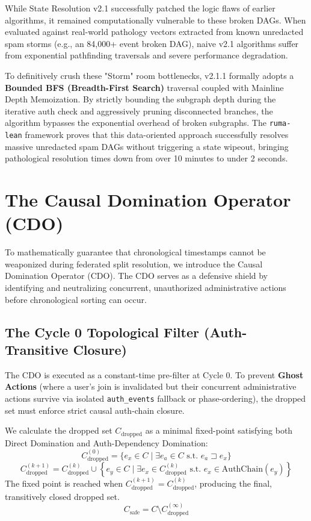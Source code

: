 \documentclass[12pt]{article}
\begin{document}
While State Resolution v2.1 successfully patched the logic flaws of earlier algorithms, it remained computationally vulnerable to these broken DAGs. When evaluated against real-world pathology vectors extracted from known unredacted spam storms (e.g., an 84,000+ event broken DAG), naive v2.1 algorithms suffer from exponential pathfinding traversals and severe performance degradation.

To definitively crush these "Storm" room bottlenecks, v2.1.1 formally adopts a \textbf{Bounded BFS (Breadth-First Search)} traversal coupled with Mainline Depth Memoization. By strictly bounding the subgraph depth during the iterative auth check and aggressively pruning disconnected branches, the algorithm bypasses the exponential overhead of broken subgraphs. The \texttt{ruma-lean} framework proves that this data-oriented approach successfully resolves massive unredacted spam DAGs without triggering a state wipeout, bringing pathological resolution times down from over 10 minutes to under 2 seconds.

\section{The Causal Domination Operator (CDO)}
To mathematically guarantee that chronological timestamps cannot be weaponized during federated split resolution, we introduce the Causal Domination Operator (CDO). The CDO serves as a defensive shield by identifying and neutralizing concurrent, unauthorized administrative actions before chronological sorting can occur.

\subsection{The Cycle 0 Topological Filter (Auth-Transitive Closure)}
The CDO is executed as a constant-time pre-filter at Cycle 0. To prevent \textbf{Ghost Actions} (where a user's join is invalidated but their concurrent administrative actions survive via isolated \texttt{auth\_events} fallback or phase-ordering), the dropped set must enforce strict causal auth-chain closure.

We calculate the dropped set $C_{\text{dropped}}$ as a minimal fixed-point satisfying both Direct Domination and Auth-Dependency Domination:
\begin{equation}
    C_{\text{dropped}}^{(0)} = \{ e_x \in C \mid \exists e_a \in C \text{ s.t. } e_a \sqsupset e_x \}
\end{equation}
\begin{equation}
    C_{\text{dropped}}^{(k+1)} = C_{\text{dropped}}^{(k)} \cup \left\{ e_y \in C \mid \exists e_x \in C_{\text{dropped}}^{(k)} \text{ s.t. } e_x \in \text{AuthChain}(e_y) \right\}
\end{equation}
The fixed point is reached when $C_{\text{dropped}}^{(k+1)} = C_{\text{dropped}}^{(k)}$, producing the final, transitively closed dropped set.
\begin{equation}
    C_{\text{safe}} = C \setminus C_{\text{dropped}}^{(\infty)}
\end{equation}
\end{document}
